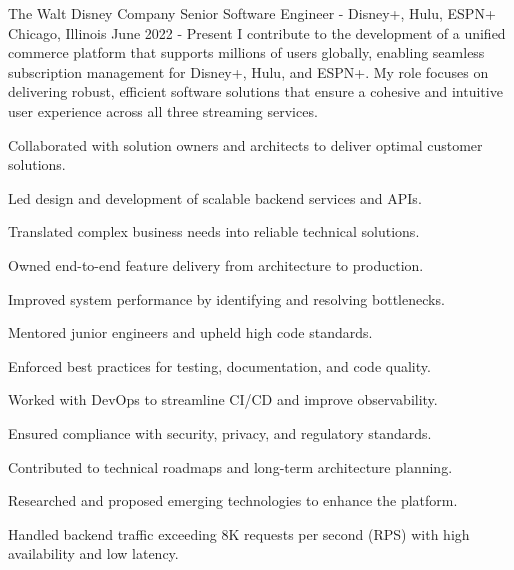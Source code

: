 
\begin{cventries}

  \experienceentry
  {The Walt Disney Company} %
    {Senior Software Engineer - Disney+, Hulu, ESPN+} %
    {Chicago, Illinois} %
    {June 2022 - Present} %
    {I contribute to the development of a unified commerce platform that supports millions of users globally, enabling seamless subscription management for Disney+, Hulu, and ESPN+. My role focuses on delivering robust, efficient software solutions that ensure a cohesive and intuitive user experience across all three streaming services.}
    {
      \begin{cvitems} %
      	\item {Collaborated with solution owners and architects to deliver optimal customer solutions.}
      	\item {Led design and development of scalable backend services and APIs.}
		\item {Translated complex business needs into reliable technical solutions.}
		\item {Owned end-to-end feature delivery from architecture to production.}
		\item {Improved system performance by identifying and resolving bottlenecks.}
		\item {Mentored junior engineers and upheld high code standards.}
		\item {Enforced best practices for testing, documentation, and code quality.}
		\item {Worked with DevOps to streamline CI/CD and improve observability.}
		\item {Ensured compliance with security, privacy, and regulatory standards.}
		\item {Contributed to technical roadmaps and long-term architecture planning.}
		\item {Researched and proposed emerging technologies to enhance the platform.}
		\item {Handled backend traffic exceeding 8K requests per second (RPS) with high availability and low latency.}

\end{cvitems}}
\end{cventries}
